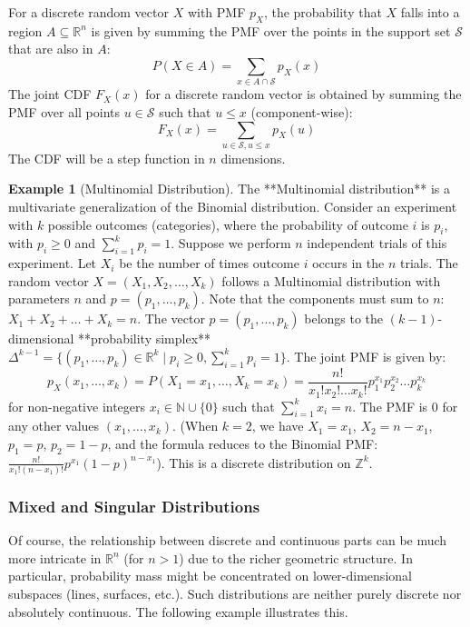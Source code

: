 \documentclass[11pt, a4paper]{article}
\theoremstyle{definition} %
\newtheorem{example}[theorem]{Example}
\newcommand{\R}{\mathbb{R}}
\newcommand{\N}{\mathbb{N}}
\begin{document}
For a discrete random vector $X$ with PMF $p_X$, the probability that $X$ falls into a region $A \subseteq \R^n$ is given by summing the PMF over the points in the support set $\mathcal{S}$ that are also in $A$:
\[ P(X \in A) = \sum_{x \in A \cap \mathcal{S}} p_X(x) \]
The joint CDF $F_X(x)$ for a discrete random vector is obtained by summing the PMF over all points $u \in \mathcal{S}$ such that $u \le x$ (component-wise):
\[ F_X(x) = \sum_{u \in \mathcal{S}, u \le x} p_X(u) \]
The CDF will be a step function in $n$ dimensions.

\begin{example}[Multinomial Distribution] \label{ex:multinomial}
The **Multinomial distribution** is a multivariate generalization of the Binomial distribution. Consider an experiment with $k$ possible outcomes (categories), where the probability of outcome $i$ is $p_i$, with $p_i \ge 0$ and $\sum_{i=1}^k p_i = 1$. Suppose we perform $n$ independent trials of this experiment. Let $X_i$ be the number of times outcome $i$ occurs in the $n$ trials. The random vector $X = (X_1, X_2, \dots, X_k)$ follows a Multinomial distribution with parameters $n$ and $p = (p_1, \dots, p_k)$.
Note that the components must sum to $n$: $X_1 + X_2 + \dots + X_k = n$. The vector $p = (p_1, \dots, p_k)$ belongs to the $(k-1)$-dimensional **probability simplex** $\Delta^{k-1} = \{ (p_1, \dots, p_k) \in \R^k \mid p_i \ge 0, \sum_{i=1}^k p_i = 1 \}$.
The joint PMF is given by:
\begin{equation} \label{eq:multinomial_pmf}
p_X(x_1, \dots, x_k) = P(X_1=x_1, \dots, X_k=x_k) = \frac{n!}{x_1! x_2! \dots x_k!} p_1^{x_1} p_2^{x_2} \dots p_k^{x_k}
\end{equation}
for non-negative integers $x_i \in \N \cup \{0\}$ such that $\sum_{i=1}^k x_i = n$. The PMF is 0 for any other values $(x_1, \dots, x_k)$.
(When $k=2$, we have $X_1 = x_1$, $X_2 = n-x_1$, $p_1=p$, $p_2=1-p$, and the formula reduces to the Binomial PMF: $\frac{n!}{x_1!(n-x_1)!} p^{x_1} (1-p)^{n-x_1}$).
This is a discrete distribution on $\mathbb{Z}^k$.
\end{example}

\subsubsection*{Mixed and Singular Distributions}

Of course, the relationship between discrete and continuous parts can be much more intricate in $\R^n$ (for $n > 1$) due to the richer geometric structure. In particular, probability mass might be concentrated on lower-dimensional subspaces (lines, surfaces, etc.). Such distributions are neither purely discrete nor absolutely continuous. The following example illustrates this.
\end{document}
